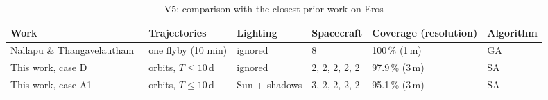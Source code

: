 \begin{table}[htbp]
\centering
\caption{V5: comparison with the closest prior work on Eros}
\label{tab:v5}
\scriptsize
\begin{tabular}{@{}llllll@{}}
\toprule
Work & Trajectories & Lighting & Spacecraft & Coverage (resolution) & Algorithm \\
\midrule
Nallapu \& Thangavelautham~\cite{nallapu2019} & one flyby (10 min) & ignored & 8 & 100\,\% (1\,m) & GA \\
This work, case D & orbits, $T\le10$\,d & ignored & 2, 2, 2, 2, 2 & 97.9\,\% (3\,m) & SA \\
This work, case A1 & orbits, $T\le10$\,d & Sun + shadows & 3, 2, 2, 2, 2 & 95.1\,\% (3\,m) & SA \\
\bottomrule
\end{tabular}
\end{table}
